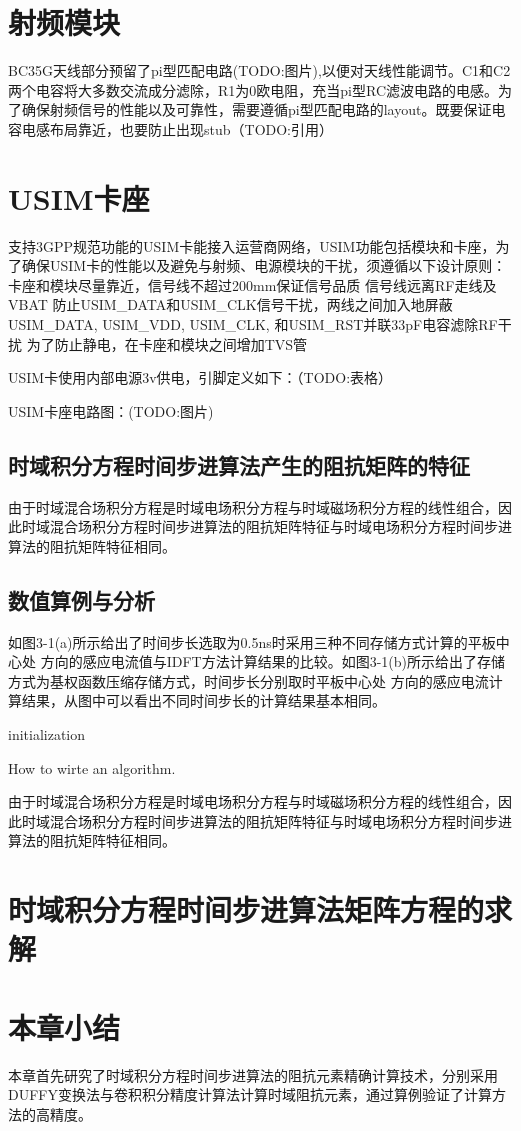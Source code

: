\section{射频模块}
BC35G天线部分预留了pi型匹配电路(TODO:图片),以便对天线性能调节。C1和C2两个电容将大多数交流成分滤除，R1为0欧电阻，充当pi型RC滤波电路的电感。为了确保射频信号的性能以及可靠性，需要遵循pi型匹配电路的layout。既要保证电容电感布局靠近，也要防止出现stub（TODO:引用）

\section{USIM卡座}
支持3GPP规范功能的USIM卡能接入运营商网络，USIM功能包括模块和卡座，为了确保USIM卡的性能以及避免与射频、电源模块的干扰，须遵循以下设计原则：
卡座和模块尽量靠近，信号线不超过200mm保证信号品质
信号线远离RF走线及VBAT
防止USIM\_DATA和USIM\_CLK信号干扰，两线之间加入地屏蔽
USIM\_DATA, USIM\_VDD, USIM\_CLK, 和USIM\_RST并联33pF电容滤除RF干扰
为了防止静电，在卡座和模块之间增加TVS管

USIM卡使用内部电源3v供电，引脚定义如下：（TODO:表格）

USIM卡座电路图：(TODO:图片)

\subsection{时域积分方程时间步进算法产生的阻抗矩阵的特征}
由于时域混合场积分方程是时域电场积分方程与时域磁场积分方程的线性组合，因此时域混合场积分方程时间步进算法的阻抗矩阵特征与时域电场积分方程时间步进算法的阻抗矩阵特征相同。

\subsection{数值算例与分析}

如图3-1(a)所示给出了时间步长选取为0.5ns时采用三种不同存储方式计算的平板中心处 方向的感应电流值与IDFT方法计算结果的比较。如图3-1(b)所示给出了存储方式为基权函数压缩存储方式，时间步长分别取时平板中心处 方向的感应电流计算结果，从图中可以看出不同时间步长的计算结果基本相同。

\begin{algorithm}[H]
 initialization\;
 \caption{How to wirte an algorithm.}
\end{algorithm}

由于时域混合场积分方程是时域电场积分方程与时域磁场积分方程的线性组合，因此时域混合场积分方程时间步进算法的阻抗矩阵特征与时域电场积分方程时间步进算法的阻抗矩阵特征相同。

\section{时域积分方程时间步进算法矩阵方程的求解}

\section{本章小结}
本章首先研究了时域积分方程时间步进算法的阻抗元素精确计算技术，分别采用DUFFY变换法与卷积积分精度计算法计算时域阻抗元素，通过算例验证了计算方法的高精度。